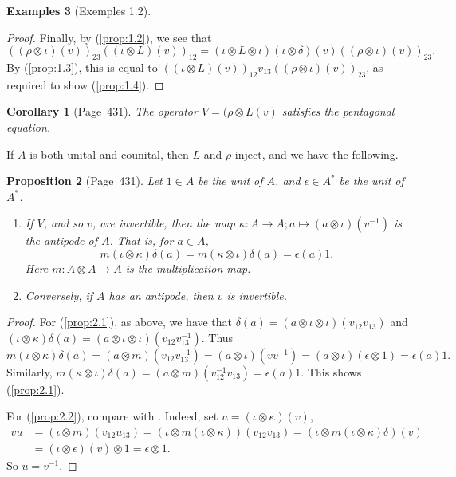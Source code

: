\documentclass[a4paper,12pt]{article}
\theoremstyle{plain}
\newtheorem{proposition}{Proposition}[section]
\newtheorem{corollary}[proposition]{Corollary}
\theoremstyle{definition}
\newtheorem{examples}[proposition]{Examples}
\begin{document}
\begin{examples}[Exemples 1.2]
\begin{enumerate}
\begin{proof}
Finally, by (\ref{prop:1.2}), we see that
\[ ((\rho\otimes\iota)(v))_{23} ((\iota\otimes L)(v))_{12}
= (\iota\otimes L\otimes\iota)(\iota\otimes\delta)(v)
((\rho\otimes\iota)(v))_{23}. \]
By (\ref{prop:1.3}), this is equal to
$((\iota\otimes L)(v))_{12} v_{13} ((\rho\otimes\iota)(v))_{23}$,
as required to show (\ref{prop:1.4}).
\end{proof}

\begin{corollary}[Page~431]
The operator $V=(\rho\otimes L(v)$ satisfies the pentagonal equation.
\end{corollary}

If $A$ is both unital and counital, then $L$ and $\rho$ inject, and we have
the following.

\begin{proposition}[Page~431]
Let $1\in A$ be the unit of $A$, and $\epsilon\in A^*$ be the unit of $A^*$.
\begin{enumerate}
\item\label{prop:2.1} If $V$, and so $v$, are invertible, then the map
$\kappa:A\rightarrow A; a\mapsto (a\otimes\iota)(v^{-1})$ is the antipode of
$A$.  That is, for $a\in A$,
\[ m(\iota\otimes\kappa)\delta(a) = m(\kappa\otimes\iota)\delta(a)
= \epsilon(a) 1. \]
Here $m:A\otimes A\rightarrow A$ is the multiplication map.
\item\label{prop:2.2} Conversely, if $A$ has an antipode, then $v$ is
invertible.
\end{enumerate}
\end{proposition}
\begin{proof}
For (\ref{prop:2.1}), as above, we have that $\delta(a)
= (a\otimes\iota\otimes\iota)(v_{12} v_{13})$ and
$(\iota\otimes\kappa)\delta(a)
= (a\otimes\iota\otimes\iota)(v_{12} v_{13}^{-1})$.  Thus
\[ m(\iota\otimes\kappa)\delta(a)
= (a\otimes m)(v_{12} v_{13}^{-1})
= (a\otimes\iota)(v v^{-1})
= (a\otimes\iota)(\epsilon\otimes 1) = \epsilon(a) 1. \]
Similarly, $m(\kappa\otimes\iota)\delta(a) = (a\otimes m)(v_{12}^{-1}v_{13})
= \epsilon(a)1$.  This shows (\ref{prop:2.1}).

For (\ref{prop:2.2}), compare with \cite{r1}.  Indeed, set
$u = (\iota\otimes\kappa)(v)$,
\begin{align*} vu &= (\iota\otimes m)(v_{12} u_{13})
= (\iota\otimes m(\iota\otimes\kappa))(v_{12} v_{13})
= (\iota\otimes m(\iota\otimes\kappa)\delta)(v) \\
&= (\iota\otimes\epsilon)(v)\otimes 1 = \epsilon\otimes 1. \end{align*}
So $u=v^{-1}$.
\end{proof}
\end{enumerate}
\end{examples}
\end{document}
